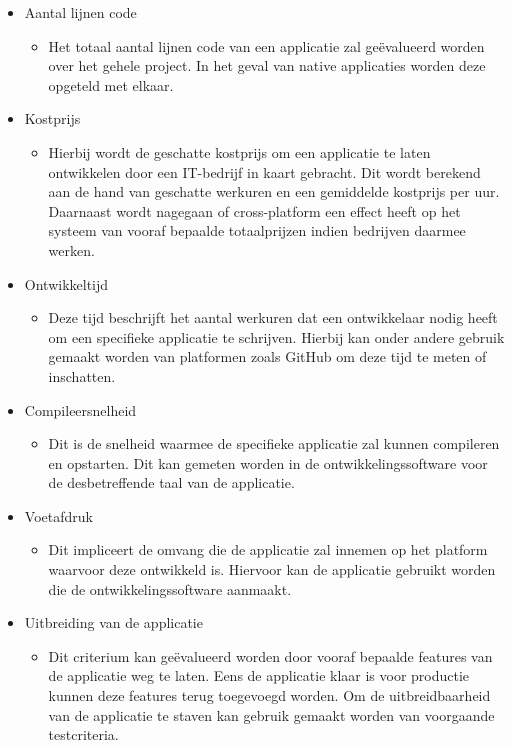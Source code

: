 \begin{itemize}
    \item Aantal lijnen code
    \begin{itemize}
        \item Het totaal aantal lijnen code van een applicatie zal geëvalueerd worden over het gehele project. In het geval van native applicaties worden deze opgeteld met elkaar.
    \end{itemize}
    \item Kostprijs
    \begin{itemize}
        \item Hierbij wordt de geschatte kostprijs om een applicatie te laten ontwikkelen door een IT-bedrijf in kaart gebracht. Dit wordt berekend aan de hand van geschatte werkuren en een gemiddelde kostprijs per uur. Daarnaast wordt nagegaan of cross-platform een effect heeft op het systeem van vooraf bepaalde totaalprijzen indien bedrijven daarmee werken.
    \end{itemize}
    \item Ontwikkeltijd
    \begin{itemize}
        \item Deze tijd beschrijft het aantal werkuren dat een ontwikkelaar nodig heeft om een specifieke applicatie te schrijven. Hierbij kan onder andere gebruik gemaakt worden van platformen zoals GitHub om deze tijd te meten of inschatten.
    \end{itemize}
    \item Compileersnelheid
    \begin{itemize}
        \item Dit is de snelheid waarmee de specifieke applicatie zal kunnen compileren en opstarten. Dit kan gemeten worden in de ontwikkelingssoftware voor de desbetreffende taal van de applicatie.
    \end{itemize}
    \item Voetafdruk
    \begin{itemize}
        \item Dit impliceert de omvang die de applicatie zal innemen op het platform waarvoor deze ontwikkeld is. Hiervoor kan de applicatie gebruikt worden die de ontwikkelingssoftware aanmaakt.
    \end{itemize}
    \item Uitbreiding van de applicatie
    \begin{itemize}
        \item Dit criterium kan geëvalueerd worden door vooraf bepaalde features van de applicatie weg te laten. Eens de applicatie klaar is voor productie kunnen deze features terug toegevoegd worden. Om de uitbreidbaarheid van de applicatie te staven kan gebruik gemaakt worden van voorgaande testcriteria.
    \end{itemize}
\end{itemize}

